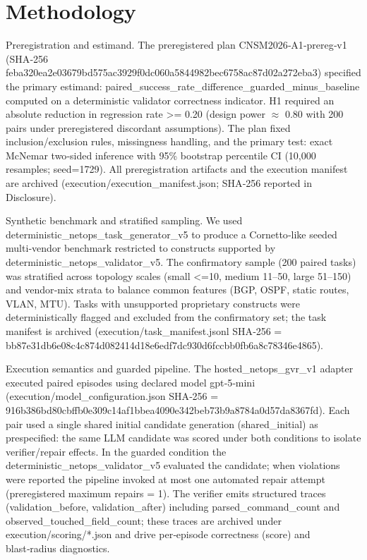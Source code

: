\documentclass[conference]{IEEEtran}
\begin{document}
\section{Methodology}
Preregistration and estimand. The preregistered plan CNSM2026‑A1‑prereg‑v1 (SHA‑256 feba320ea2e03679bd575ac3929f0dc060a5844982bec6758ac87d02a272eba3) specified the primary estimand: paired\_success\_rate\_difference\_guarded\_minus\_baseline computed on a deterministic validator correctness indicator. H1 required an absolute reduction in regression rate >= 0.20 (design power \ensuremath{\approx} 0.80 with 200 pairs under preregistered discordant assumptions). The plan fixed inclusion/exclusion rules, missingness handling, and the primary test: exact McNemar two‑sided inference with 95\% bootstrap percentile CI (10,000 resamples; seed=1729). All preregistration artifacts and the execution manifest are archived (execution/execution\_manifest.json; SHA‑256 reported in Disclosure).

Synthetic benchmark and stratified sampling. We used deterministic\_netops\_task\_generator\_v5 to produce a Cornetto‑like seeded multi‑vendor benchmark restricted to constructs supported by deterministic\_netops\_validator\_v5. The confirmatory sample (200 paired tasks) was stratified across topology scales (small <=10, medium 11--50, large 51--150) and vendor‑mix strata to balance common features (BGP, OSPF, static routes, VLAN, MTU). Tasks with unsupported proprietary constructs were deterministically flagged and excluded from the confirmatory set; the task manifest is archived (execution/task\_manifest.jsonl SHA‑256 = bb87e31db6e08c4c874d082414d18e6edf7dc930d6fccbb0fb6a8c78346e4865).

Execution semantics and guarded pipeline. The hosted\_netops\_gvr\_v1 adapter executed paired episodes using declared model gpt‑5‑mini (execution/model\_configuration.json SHA‑256 = 916b386bd80cbffb0e309c14af1bbea4090e342beb73b9a8784a0d57da8367fd). Each pair used a single shared initial candidate generation (shared\_initial) as prespecified: the same LLM candidate was scored under both conditions to isolate verifier/repair effects. In the guarded condition the deterministic\_netops\_validator\_v5 evaluated the candidate; when violations were reported the pipeline invoked at most one automated repair attempt (preregistered maximum repairs = 1). The verifier emits structured traces (validation\_before, validation\_after) including parsed\_command\_count and observed\_touched\_field\_count; these traces are archived under execution/scoring/*.json and drive per‑episode correctness (score) and blast‑radius diagnostics.
\end{document}
